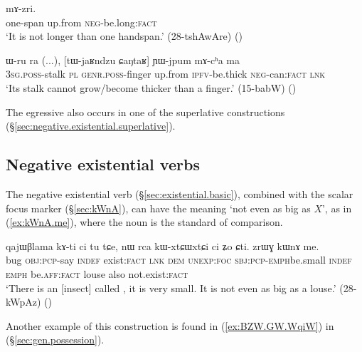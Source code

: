 \begin{exe}
\ex \label{ex:CaNtaR.mAzri}
  mɤ-zri. \\
 one-span up.from \textsc{neg}-be.long:\textsc{fact} \\
 \glt `It is not longer than one handspan.' (28-tshAwAre)
 ()
 \end{exe}

\begin{exe}
\ex \label{ex:CaNtaR.YWjpum.mAcha}
 \gll ɯ-ru ra (...), [tɯ-jaʁndzu ɕaŋtaʁ] ɲɯ-jpum mɤ-cʰa ma \\
 \textsc{3sg}.\textsc{poss}-stalk \textsc{pl} {  } \textsc{genr}.\textsc{poss}-finger up.from \textsc{ipfv}-be.thick \textsc{neg}-can:\textsc{fact} \textsc{lnk} \\
 \glt `Its stalk cannot grow/become thicker than a finger.' (15-babW)
()
 \end{exe}

The egressive  also occurs in one of the superlative constructions (§\ref{sec:negative.existential.superlative}).

\subsection{Negative existential verbs} \label{sec:existential.comparative}
The negative existential verb  (§\ref{sec:existential.basic}), combined with the scalar focus marker  (§\ref{sec:kWnA}), can have the meaning `not even as big as $X$', as in (\ref{ex:kWnA.me}), where the noun 
 is the standard of comparison.

\begin{exe}
\ex \label{ex:kWnA.me}
\gll qajɯβlama kɤ-ti ci tu tɕe, nɯ rca kɯ-xtɕɯ\redp{}xtɕi ci ʑo ɕti. zrɯɣ kɯnɤ me. \\
bug \textsc{obj}:\textsc{pcp}-say \textsc{indef} exist:\textsc{fact} \textsc{lnk} \textsc{dem} \textsc{unexp}:\textsc{foc} \textsc{sbj}:\textsc{pcp}-\textsc{emph}\redp{}be.small \textsc{indef} \textsc{emph} be.\textsc{aff}:\textsc{fact} louse also not.exist:\textsc{fact} \\
\glt `There is an [insect] called , it is very small. It is not even as big as a louse.' (28-kWpAz)
()
\end{exe}
 
Another example of this construction is found in (\ref{ex:BZW.GW.WqiW}) in (§\ref{sec:gen.possession}).

